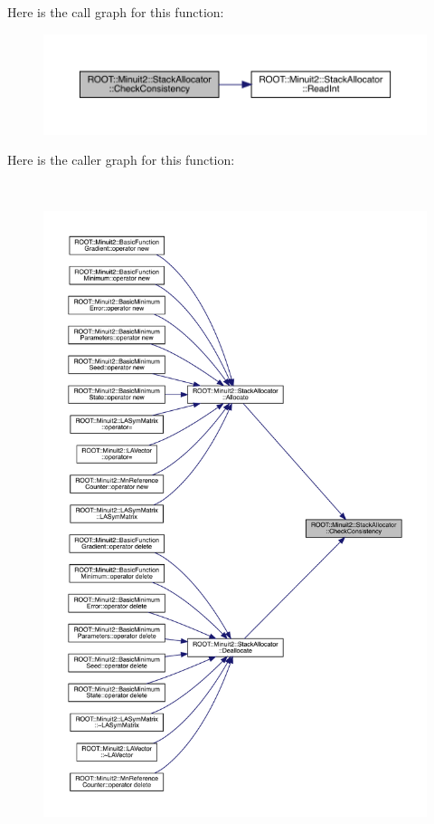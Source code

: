 Here is the call graph for this function\+:
\nopagebreak
\begin{figure}[H]
\begin{center}
\leavevmode
\includegraphics[width=350pt]{d3/d1e/classROOT_1_1Minuit2_1_1StackAllocator_ad1189cdc76a07c36ef1924ad2488797d_cgraph}
\end{center}
\end{figure}
Here is the caller graph for this function\+:
\nopagebreak
\begin{figure}[H]
\begin{center}
\leavevmode
\includegraphics[height=550pt]{d3/d1e/classROOT_1_1Minuit2_1_1StackAllocator_ad1189cdc76a07c36ef1924ad2488797d_icgraph}
\end{center}
\end{figure}
\mbox{\label{classROOT_1_1Minuit2_1_1StackAllocator_ad1189cdc76a07c36ef1924ad2488797d}} 
